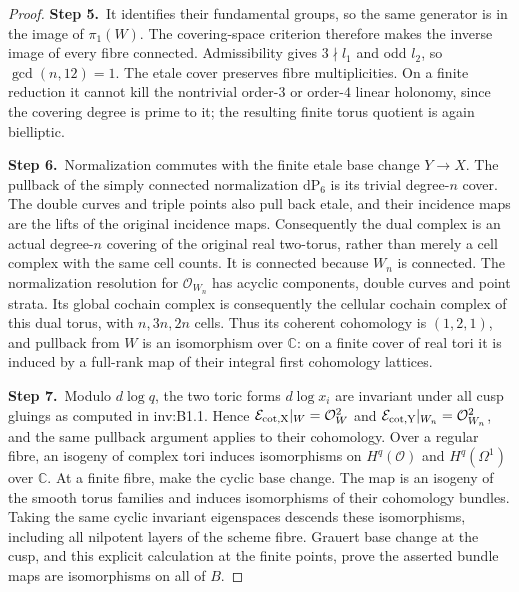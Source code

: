 \documentclass[11pt,a4paper]{article}
\theoremstyle{plain}
\theoremstyle{definition}
\begin{document}
\begin{proof}
\par\smallskip\noindent\textbf{Step 5.}\ It identifies their fundamental groups, so the same generator is in the image of $\pi_1(W)$.
The covering-space criterion therefore makes the inverse image of
every fibre connected. Admissibility gives $3\nmid l_1$ and odd $l_2$,
so $\gcd(n,12)=1$. The etale cover preserves fibre multiplicities.
On a finite reduction it cannot kill the nontrivial order-$3$ or
order-$4$ linear holonomy, since the covering degree is prime to it;
the resulting finite torus quotient is again bielliptic.

\par\smallskip\noindent\textbf{Step 6.}\ Normalization commutes with the finite etale base change $Y\to X$.
The pullback of the simply connected normalization $\mathrm{dP}_6$
is its trivial degree-$n$ cover. The double curves and triple points
also pull back etale, and their incidence maps are the lifts of the
original incidence maps. Consequently the dual complex is an actual
degree-$n$ covering of the original real two-torus, rather than merely
a cell complex with the same cell counts. It is connected because
$W_n$ is connected. The normalization resolution for $\mathcal O_{W_n}$
has acyclic components, double curves and point strata. Its global
cochain complex is consequently the cellular cochain complex of this
dual torus, with $n,3n,2n$ cells. Thus its coherent cohomology is
$(1,2,1)$, and pullback from $W$ is an isomorphism over $\mathbb C$:
on a finite cover of real tori it is induced by a full-rank map of
their integral first cohomology lattices.

\par\smallskip\noindent\textbf{Step 7.}\ Modulo $d\log q$, the two toric forms $d\log x_i$ are invariant
under all cusp gluings as computed in inv:B1.1. Hence
$\mathcal E_{\rm cot,X}|_W=\mathcal O_W^2$ and $\mathcal E_{\rm cot,Y}|_{W_n}=\mathcal O_{W_n}^2$,
and the same pullback argument applies to their cohomology.
Over a regular fibre, an isogeny of complex tori induces isomorphisms
on $H^q(\mathcal O)$ and $H^q(\Omega^1)$ over $\mathbb C$.
At a finite fibre, make the cyclic base change. The map is an isogeny
of the smooth torus families and induces isomorphisms of their
cohomology bundles. Taking the same cyclic invariant eigenspaces
descends these isomorphisms, including all nilpotent layers of the
scheme fibre. Grauert base change at the cusp, and this explicit
calculation at the finite points, prove the asserted bundle maps are
isomorphisms on all of $B$.
\end{proof}
\end{document}
